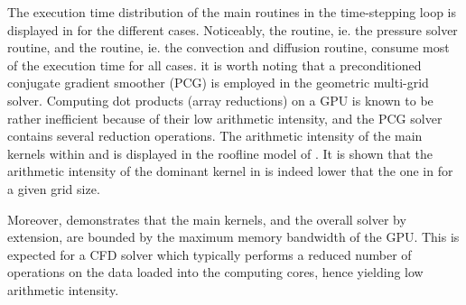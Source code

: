 \documentclass[10pt,a4paper]{article}
\begin{document}
The execution time distribution of the main routines in the time-stepping loop is displayed in  for the different cases. Noticeably, the  routine, ie. the pressure solver routine, and the  routine, ie. the convection and diffusion routine, consume most of the execution time for all cases. it is worth noting that a preconditioned conjugate gradient smoother (PCG) is employed in the geometric multi-grid solver. Computing dot products (array reductions) on a GPU is known to be rather inefficient because of their low arithmetic intensity, and the PCG solver contains several reduction operations. The arithmetic intensity of the main kernels within  and  is displayed in the roofline model of . It is shown that the arithmetic intensity of the dominant kernel in  is indeed lower that the one in  for a given grid size.

Moreover,  demonstrates that the main kernels, and the overall solver by extension, are bounded by the maximum memory bandwidth of the GPU. This is expected for a CFD solver which typically performs a reduced number of operations on the data loaded into the computing cores, hence yielding low arithmetic intensity.
\end{document}
